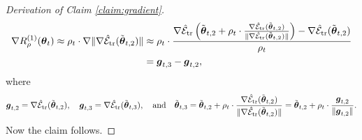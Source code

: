 \begin{proof} [Derivation of Claim \ref{claim:gradient}]
    \begin{equation}
        \begin{aligned}
            \nabla R^{(1)}_{\rho}(\boldsymbol{\theta}_t) \approx \rho_t \cdot \nabla \|\nabla \hat{\mathcal{E}}_{{\text{tr}}}(\tilde{\boldsymbol{\theta}}_{t,2})\| & \approx \rho_t \cdot \frac{\nabla \hat{\mathcal{E}}_{{\text{tr}}}\left(\tilde{\boldsymbol{\theta}}_{t,2}  + \rho_t \cdot \frac{\nabla \hat{\mathcal{E}}_{{\text{tr}}}(\tilde{\boldsymbol{\theta}}_{t,2} )}{\|\nabla \hat{\mathcal{E}}_{{\text{tr}}}(\tilde{\boldsymbol{\theta}}_{t,2} )\|}\right) - \nabla \hat{\mathcal{E}}_{{\text{tr}}}(\tilde{\boldsymbol{\theta}}_{t,2})}{\rho_t} \\
            & = \boldsymbol{g}_{t,3} - \boldsymbol{g}_{t,2},
        \end{aligned}
    \end{equation}
    where
    \begin{equation}
        \boldsymbol{g}_{t,2} = \nabla \hat{\mathcal{E}}_{{\text{tr}}}(\tilde{\boldsymbol{\theta}}_{t,2}),\quad \boldsymbol{g}_{t,3} = \nabla \hat{\mathcal{E}}_{{\text{tr}}}(\tilde{\boldsymbol{\theta}}_{t,3}), \quad \text{and} \quad \tilde{\boldsymbol{\theta}}_{t,3} = \tilde{\boldsymbol{\theta}}_{t,2}  + \rho_t \cdot \frac{\nabla \hat{\mathcal{E}}_{{\text{tr}}}(\tilde{\boldsymbol{\theta}}_{t,2} )}{\|\nabla \hat{\mathcal{E}}_{{\text{tr}}}(\tilde{\boldsymbol{\theta}}_{t,2} )\|} = \tilde{\boldsymbol{\theta}}_{t,2}  + \rho_t \cdot \frac{\boldsymbol{g}_{t,2}}{\|\boldsymbol{g}_{t,2}\|}.
    \end{equation}
    Now the claim follows.
\end{proof}

